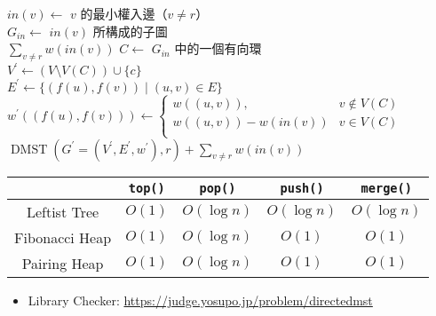 \documentclass[standalone]{beamer}
\begin{document}
\begin{frame}{}
  \begin{algorithm}[H]

     {
      $in(v) \gets$ $v$ 的最小權入邊（$v \neq r$） \\
      $G_{in} \gets$ $in(v)$ 所構成的子圖 \\
    }
     {
       {
        \Return $\sum_{v \neq r}w(in(v))$
      }
    }
     {
      $C \gets$ $G_{in}$ 中的一個有向環 \\
      $V^\prime \gets (V \setminus V(C)) \cup \{c\}$ \\
      $E^\prime \gets \{(f(u), f(v)) \mid (u, v) \in E\}$ \\
    }
     {
      $w^\prime((f(u), f(v))) \gets
        \begin{cases}
          w((u, v)), & v \not\in V(C) \\
          w((u, v)) - w(in(v)) & v \in V(C) \\
        \end{cases}$ \\
    }
     {
      \Return $\operatorname{DMST}(G^\prime = (V^\prime, E^\prime, w^\prime), r) + \sum_{v \neq r}w(in(v))$
    }
  \end{algorithm}
\end{frame}

\begin{frame}{}
  \begin{tabular}{| c | c | c | c | c |}
    \hline
    & \texttt{top()} & \texttt{pop()} & \texttt{push()} & \texttt{merge()} \\\hline
    Leftist Tree & $O(1)$ & $O(\log{n})$ & $O(\log{n})$ & $O(\log{n})$ \\\hline
    Fibonacci Heap & $O(1)$ & $O(\log{n})$ & $O(1)$ & $O(1)$ \\\hline
    Pairing Heap & $O(1)$ & $O(\log{n})$ & $O(1)$ & $O(1)$ \\\hline
  \end{tabular}

  \begin{itemize}
    \item Library Checker: \url{https://judge.yosupo.jp/problem/directedmst}
  \end{itemize}
\end{frame}
\end{document}
